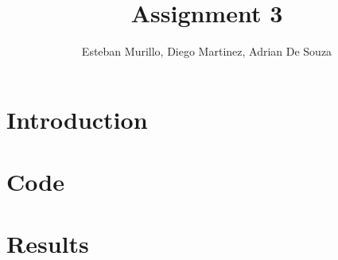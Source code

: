 \documentclass[12pt]{article}
\title{Assignment 3}
\author{Esteban Murillo, Diego Martinez, Adrian De Souza}
\begin{document}
\maketitle

\section*{Introduction}

\section*{Code}

\section*{Results}
\end{document}

